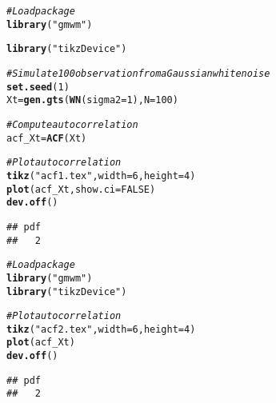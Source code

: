 \documentclass{article}\usepackage[]{graphicx}\usepackage[]{color}
\makeatletter
\newcommand{\hlnum}[1]{\textcolor[rgb]{0.686,0.059,0.569}{#1}}%
\newcommand{\hlstr}[1]{\textcolor[rgb]{0.192,0.494,0.8}{#1}}%
\newcommand{\hlcom}[1]{\textcolor[rgb]{0.678,0.584,0.686}{\textit{#1}}}%
\newcommand{\hlstd}[1]{\textcolor[rgb]{0.345,0.345,0.345}{#1}}%
\newcommand{\hlkwb}[1]{\textcolor[rgb]{0.69,0.353,0.396}{#1}}%
\newcommand{\hlkwc}[1]{\textcolor[rgb]{0.333,0.667,0.333}{#1}}%
\newcommand{\hlkwd}[1]{\textcolor[rgb]{0.737,0.353,0.396}{\textbf{#1}}}%
\newenvironment{kframe}{%
 \def\at@end@of@kframe{}%
 \ifinner\ifhmode%
  \def\at@end@of@kframe{\end{minipage}}%
  \begin{minipage}{\columnwidth}%
 \fi\fi%
 \def\FrameCommand##1{\hskip\@totalleftmargin \hskip-\fboxsep
 \colorbox{shadecolor}{##1}\hskip-\fboxsep
     \hskip-\linewidth \hskip-\@totalleftmargin \hskip\columnwidth}%
 \MakeFramed {\advance\hsize-\width
   \@totalleftmargin\z@ \linewidth\hsize
   \@setminipage}}%
 {\par\unskip\endMakeFramed%
 \at@end@of@kframe}
\newenvironment{knitrout}{}{} %
\makeatother
\begin{document}
\begin{knitrout}
\color{fgcolor}\begin{kframe}
\begin{alltt}
\hlcom{# Load package}
\hlkwd{library}\hlstd{(}\hlstr{"gmwm"}\hlstd{)}
\end{alltt}


{\ttfamily\noindent\itshape\color{messagecolor}{\#\# Loading required package: ggplot2}}\begin{alltt}
\hlkwd{library}\hlstd{(}\hlstr{"tikzDevice"}\hlstd{)}

\hlcom{# Simulate 100 observation from a Gaussian white noise}
\hlkwd{set.seed}\hlstd{(}\hlnum{1}\hlstd{)}
\hlstd{Xt} \hlkwb{=} \hlkwd{gen.gts}\hlstd{(}\hlkwd{WN}\hlstd{(}\hlkwc{sigma2} \hlstd{=} \hlnum{1}\hlstd{),} \hlkwc{N} \hlstd{=} \hlnum{100}\hlstd{)}

\hlcom{# Compute autocorrelation}
\hlstd{acf_Xt} \hlkwb{=} \hlkwd{ACF}\hlstd{(Xt)}

\hlcom{# Plot autocorrelation}
\hlkwd{tikz}\hlstd{(}\hlstr{"acf1.tex"}\hlstd{,} \hlkwc{width} \hlstd{=} \hlnum{6}\hlstd{,} \hlkwc{height} \hlstd{=} \hlnum{4}\hlstd{)}
\hlkwd{plot}\hlstd{(acf_Xt,} \hlkwc{show.ci} \hlstd{=} \hlnum{FALSE}\hlstd{)}
\hlkwd{dev.off}\hlstd{()}
\end{alltt}
\begin{verbatim}
## pdf 
##   2
\end{verbatim}
\end{kframe}
\end{knitrout}

\begin{knitrout}
\color{fgcolor}\begin{kframe}
\begin{alltt}
\hlcom{# Load package}
\hlkwd{library}\hlstd{(}\hlstr{"gmwm"}\hlstd{)}
\hlkwd{library}\hlstd{(}\hlstr{"tikzDevice"}\hlstd{)}

\hlcom{# Plot autocorrelation}
\hlkwd{tikz}\hlstd{(}\hlstr{"acf2.tex"}\hlstd{,} \hlkwc{width} \hlstd{=} \hlnum{6}\hlstd{,} \hlkwc{height} \hlstd{=} \hlnum{4}\hlstd{)}
\hlkwd{plot}\hlstd{(acf_Xt)}
\hlkwd{dev.off}\hlstd{()}
\end{alltt}
\begin{verbatim}
## pdf 
##   2
\end{verbatim}
\end{kframe}
\end{knitrout}
\end{document}
